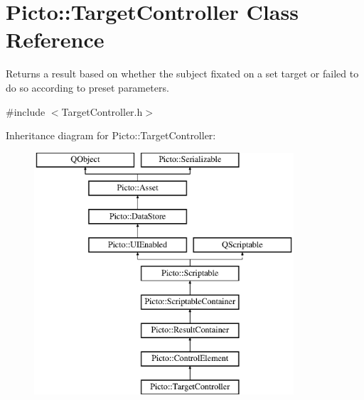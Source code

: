 \hypertarget{class_picto_1_1_target_controller}{\section{Picto\-:\-:Target\-Controller Class Reference}
\label{class_picto_1_1_target_controller}
}


Returns a result based on whether the subject fixated on a set target or failed to do so according to preset parameters.  




{\ttfamily \#include $<$Target\-Controller.\-h$>$}

Inheritance diagram for Picto\-:\-:Target\-Controller\-:\begin{figure}[H]
\begin{center}
\leavevmode
\includegraphics[height=9.000000cm]{class_picto_1_1_target_controller}
\end{center}
\end{figure}
